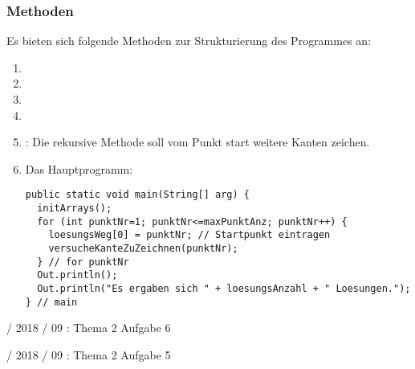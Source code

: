 \documentclass{lehramt-informatik-haupt}
\begin{document}
\subsubsection{Methoden}

Es bieten sich folgende Methoden zur Strukturierung des Programmes an:

\begin{enumerate}
\item {}
\item {}
\item {}
\item {}
\item {}: Die rekursive
Methode soll vom Punkt start weitere Kanten zeichen.

\item Das Hauptprogramm:

\begin{verbatim}
public static void main(String[] arg) {
  initArrays();
  for (int punktNr=1; punktNr<=maxPunktAnz; punktNr++) {
    loesungsWeg[0] = punktNr; // Startpunkt eintragen
    versucheKanteZuZeichnen(punktNr);
  } // for punktNr
  Out.println();
  Out.println("Es ergaben sich " + loesungsAnzahl + " Loesungen.");
} // main
\end{verbatim}

\end{enumerate}


%

 / 2018 / 09 : Thema 2 Aufgabe 6

%

 / 2018 / 09 : Thema 2 Aufgabe 5

\literatur
\end{document}
